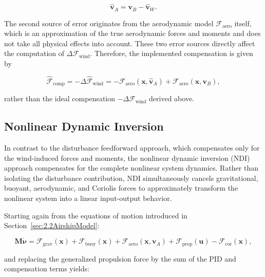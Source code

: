 \begin{equation}
	\hat{\bm{v}}_A = \bm{v}_B - \hat{\bm{v}}_W.
	\label{eq:vAhat}
\end{equation}

The second source of error originates from the aerodynamic model $\bm{\mathcal{F}}_\mathrm{aero}$ itself, which is an approximation of the true aerodynamic forces and moments and does not take all physical effects into account. These two error sources directly affect the computation of $\Delta \bm{\mathcal{F}}_\mathrm{wind}$. Therefore, the implemented compensation is given by

\begin{equation}
	\boxed{
	\hat{\bm{\mathcal{F}}}_\mathrm{comp} 
	= 
	-\Delta \hat{\bm{\mathcal{F}}}_\mathrm{wind}
	=
	-\bm{\mathcal{F}}_\mathrm{aero}(\bm{x}, \hat{\bm{v}}_A)
	+
	\bm{\mathcal{F}}_\mathrm{aero}(\bm{x}, \bm{v}_B), 
}
\end{equation}

rather than the ideal compensation $-\Delta \bm{\mathcal{F}}_\mathrm{wind}$ derived above.





\subsection{Nonlinear Dynamic Inversion}
\label{sec:NDI}

In contrast to the disturbance feedforward approach, which compensates only for the wind-induced forces and moments, the nonlinear dynamic inversion (NDI) approach compensates for the complete nonlinear system dynamics. Rather than isolating the disturbance contribution, NDI simultaneously cancels gravitational, buoyant, aerodynamic, and Coriolis forces to approximately transform the nonlinear system into a linear input-output behavior.

Starting again from the equations of motion introduced in Section~\ref{sec:2.2AirshipModel}:

\begin{equation}
	\bm{M}\dot{\bm{\nu}}
	=
	\bm{\mathcal{F}}_\mathrm{grav}(\bm{x}) 
	+ 
	\bm{\mathcal{F}}_\mathrm{buoy}(\bm{x}) 
	+ 
	\bm{\mathcal{F}}_\mathrm{aero}(\bm{x}, \bm{v}_A) 
	+ 
	\bm{\mathcal{F}}_\mathrm{prop}(\bm{u})
	- 
	\bm{\mathcal{F}}_\mathrm{cor}(\bm{x}),
	\label{eq:EOMNDI}
\end{equation}

and replacing the generalized propulsion force by the sum of the PID and compensation terms yields:

